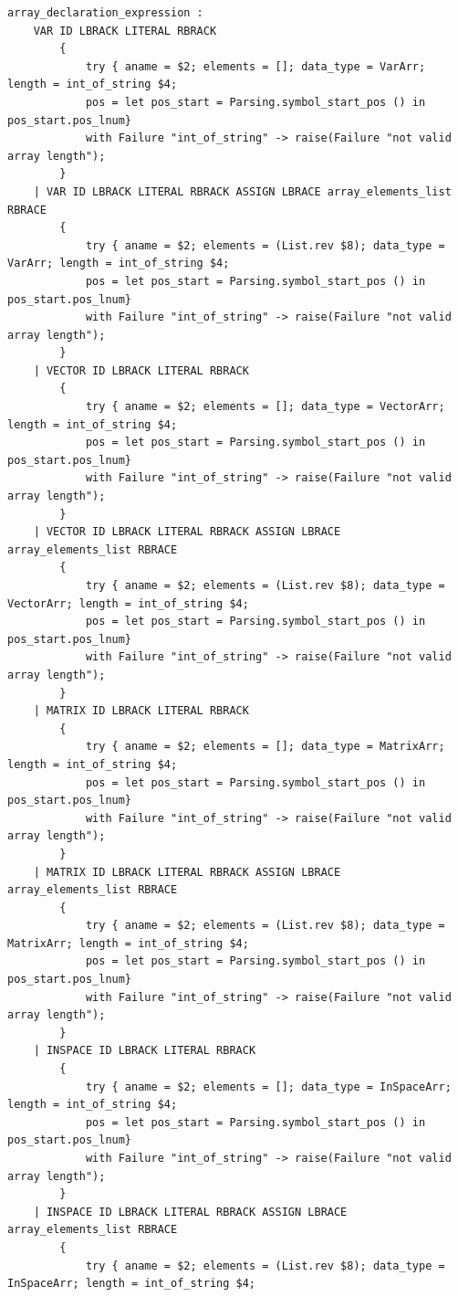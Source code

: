 \documentclass[12pt]{article} %
\begin{document}
\begin{lstlisting}[style=appendix, caption=parser.mly]
array_declaration_expression :
    VAR ID LBRACK LITERAL RBRACK 
        { 
            try { aname = $2; elements = []; data_type = VarArr; length = int_of_string $4; 
            pos = let pos_start = Parsing.symbol_start_pos () in pos_start.pos_lnum} 
            with Failure "int_of_string" -> raise(Failure "not valid array length");
        }
    | VAR ID LBRACK LITERAL RBRACK ASSIGN LBRACE array_elements_list RBRACE 
        { 
            try { aname = $2; elements = (List.rev $8); data_type = VarArr; length = int_of_string $4; 
            pos = let pos_start = Parsing.symbol_start_pos () in pos_start.pos_lnum}
            with Failure "int_of_string" -> raise(Failure "not valid array length");
        }
    | VECTOR ID LBRACK LITERAL RBRACK 
        { 
            try { aname = $2; elements = []; data_type = VectorArr; length = int_of_string $4; 
            pos = let pos_start = Parsing.symbol_start_pos () in pos_start.pos_lnum}
            with Failure "int_of_string" -> raise(Failure "not valid array length");
        }
    | VECTOR ID LBRACK LITERAL RBRACK ASSIGN LBRACE array_elements_list RBRACE 
        { 
            try { aname = $2; elements = (List.rev $8); data_type = VectorArr; length = int_of_string $4; 
            pos = let pos_start = Parsing.symbol_start_pos () in pos_start.pos_lnum}
            with Failure "int_of_string" -> raise(Failure "not valid array length");
        }
    | MATRIX ID LBRACK LITERAL RBRACK 
        { 
            try { aname = $2; elements = []; data_type = MatrixArr; length = int_of_string $4; 
            pos = let pos_start = Parsing.symbol_start_pos () in pos_start.pos_lnum}
            with Failure "int_of_string" -> raise(Failure "not valid array length");
        }
    | MATRIX ID LBRACK LITERAL RBRACK ASSIGN LBRACE array_elements_list RBRACE 
        { 
            try { aname = $2; elements = (List.rev $8); data_type = MatrixArr; length = int_of_string $4; 
            pos = let pos_start = Parsing.symbol_start_pos () in pos_start.pos_lnum}
            with Failure "int_of_string" -> raise(Failure "not valid array length");
        }
    | INSPACE ID LBRACK LITERAL RBRACK 
        { 
            try { aname = $2; elements = []; data_type = InSpaceArr; length = int_of_string $4; 
            pos = let pos_start = Parsing.symbol_start_pos () in pos_start.pos_lnum}
            with Failure "int_of_string" -> raise(Failure "not valid array length");
        }
    | INSPACE ID LBRACK LITERAL RBRACK ASSIGN LBRACE array_elements_list RBRACE 
        { 
            try { aname = $2; elements = (List.rev $8); data_type = InSpaceArr; length = int_of_string $4; 

\end{lstlisting}
\end{document}
